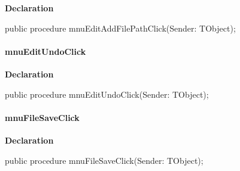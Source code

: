 \documentclass{report}
\newif\ifpdf
\begin{document}
\label{editor.TfrmEditor-mnuEditAddFilePathClick}
\begin{list}{}{
\setlength{\itemindent}{0cm}
\setlength{\listparindent}{0cm}
\setlength{\leftmargin}{\evensidemargin}
\addtolength{\leftmargin}{\tmplength}
\settowidth{\labelsep}{X}
\addtolength{\leftmargin}{\labelsep}
\setlength{\labelwidth}{\tmplength}
}
\item[\textbf{Declaration}\hfill]
\ifpdf
\begin{flushleft}
\fi
\begin{ttfamily}
public procedure mnuEditAddFilePathClick(Sender: TObject);\end{ttfamily}

\ifpdf
\end{flushleft}
\fi

\end{list}
\paragraph*{mnuEditUndoClick}\hspace*{\fill}

\label{editor.TfrmEditor-mnuEditUndoClick}
\begin{list}{}{
\setlength{\itemindent}{0cm}
\setlength{\listparindent}{0cm}
\setlength{\leftmargin}{\evensidemargin}
\addtolength{\leftmargin}{\tmplength}
\settowidth{\labelsep}{X}
\addtolength{\leftmargin}{\labelsep}
\setlength{\labelwidth}{\tmplength}
}
\item[\textbf{Declaration}\hfill]
\ifpdf
\begin{flushleft}
\fi
\begin{ttfamily}
public procedure mnuEditUndoClick(Sender: TObject);\end{ttfamily}

\ifpdf
\end{flushleft}
\fi

\end{list}
\paragraph*{mnuFileSaveClick}\hspace*{\fill}

\label{editor.TfrmEditor-mnuFileSaveClick}
\begin{list}{}{
\setlength{\itemindent}{0cm}
\setlength{\listparindent}{0cm}
\setlength{\leftmargin}{\evensidemargin}
\addtolength{\leftmargin}{\tmplength}
\settowidth{\labelsep}{X}
\addtolength{\leftmargin}{\labelsep}
\setlength{\labelwidth}{\tmplength}
}
\item[\textbf{Declaration}\hfill]
\ifpdf
\begin{flushleft}
\fi
\begin{ttfamily}
public procedure mnuFileSaveClick(Sender: TObject);\end{ttfamily}

\ifpdf
\end{flushleft}
\fi

\end{list}
\end{document}
